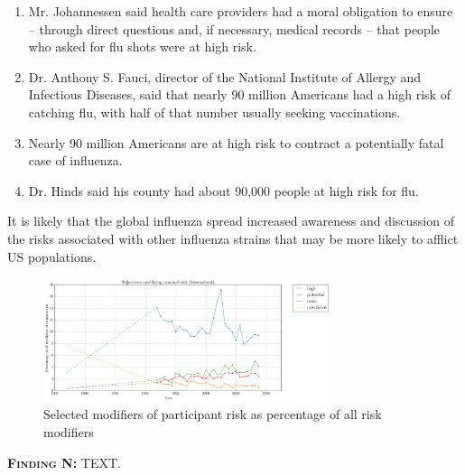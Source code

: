                 \begin{enumerate}   [before=\itshape,font=\normalfont] \setlength\itemsep{0em} \small
                    \item Mr. Johannessen said health care providers had a moral obligation to ensure -- through direct questions and, if necessary, medical records -- that people who asked for flu shots were at high risk. 
                    \item Dr. Anthony S. Fauci, director of the National Institute of Allergy and Infectious Diseases, said that nearly 90 million Americans had a high risk of catching flu, with half of that number usually seeking vaccinations. 
                    \item Nearly 90 million Americans are at high risk to contract a potentially fatal case of influenza. 
                    \item Dr. Hinds said his county had about 90,000 people at high risk for flu. 
                \end{enumerate}
                It is likely that the global influenza spread increased awareness and discussion of the risks associated with other influenza strains that may be more likely to afflict US populations. 

                

				\begin{figure}%
				\centering
				\includegraphics[width=0.75\textwidth]{../images/adjectives_modifying_nominal_risk_(lemmatised).png}
				\caption{Selected modifiers of participant risk as percentage of all risk modifiers}
				\label{fig:reladjrisk}
				\end{figure}


  \noindent\colorbox{yellow!20}{%
  \parbox{1\textwidth}{%
  \textsc{\textbf{Finding N:}} TEXT.}}


